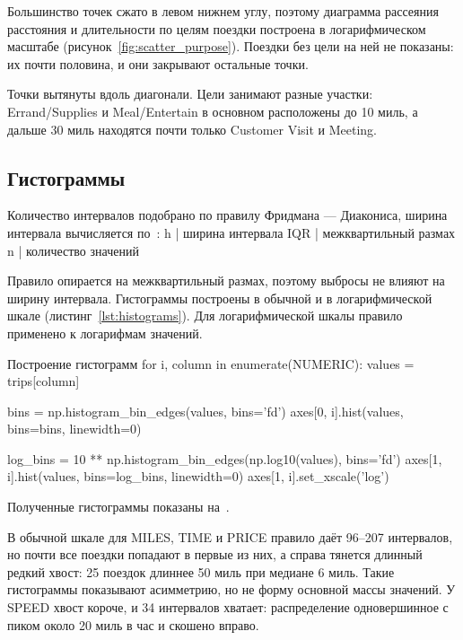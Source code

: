\documentclass[a4paper,14pt]{extarticle}
\begin{document}
Большинство точек сжато в левом нижнем углу, поэтому диаграмма рассеяния расстояния и длительности по целям поездки построена в логарифмическом масштабе (рисунок~\ref{fig:scatter_purpose}). Поездки без цели на ней не показаны: их почти половина, и они закрывают остальные точки.


Точки вытянуты вдоль диагонали. Цели занимают разные участки: Errand/Supplies и Meal/Entertain в основном расположены до 10 миль, а дальше 30 миль находятся почти только Customer Visit и Meeting.

\subsection{Гистограммы}

Количество интервалов подобрано по правилу Фридмана — Диакониса, ширина интервала вычисляется по~:
h | ширина интервала
IQR | межквартильный размах
n | количество значений

Правило опирается на межквартильный размах, поэтому выбросы не влияют на ширину интервала. Гистограммы построены в обычной и в логарифмической шкале (листинг~\ref{lst:histograms}). Для логарифмической шкалы правило применено к логарифмам значений.

\begin{code}{Построение гистограмм}
for i, column in enumerate(NUMERIC):
    values = trips[column]

    bins = np.histogram_bin_edges(values, bins='fd')
    axes[0, i].hist(values, bins=bins, linewidth=0)

    log_bins = 10 ** np.histogram_bin_edges(np.log10(values),
                                            bins='fd')
    axes[1, i].hist(values, bins=log_bins, linewidth=0)
    axes[1, i].set_xscale('log')
\end{code}

Полученные гистограммы показаны на~.


В обычной шкале для MILES, TIME и PRICE правило даёт 96–207 интервалов, но почти все поездки попадают в первые из них, а справа тянется длинный редкий хвост: 25 поездок длиннее 50 миль при медиане 6 миль. Такие гистограммы показывают асимметрию, но не форму основной массы значений. У SPEED хвост короче, и 34 интервалов хватает: распределение одновершинное с пиком около 20 миль в час и скошено вправо.
\end{document}
